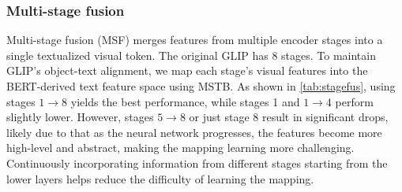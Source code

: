 \documentclass[10pt,twocolumn,letterpaper]{article}
\begin{document}
\subsubsection{Multi-stage fusion}
Multi-stage fusion (MSF) merges features from multiple encoder stages into a single textualized visual token. The original GLIP has 8 stages. To maintain GLIP's object-text alignment, we map each stage’s visual features into the BERT-derived text feature space using MSTB. As shown in \cref{tab:stagefus}, using stages $1\rightarrow 8$ yields the best performance, while stages 1 and $1\rightarrow 4$ perform slightly lower. However, stages $5\rightarrow 8$ or just stage 8 result in significant drops, likely due to that as the neural network progresses, the features become more high-level and abstract, making the mapping learning more challenging. Continuously incorporating information from different stages starting from the lower layers helps reduce the difficulty of learning the mapping. 
\end{document}
